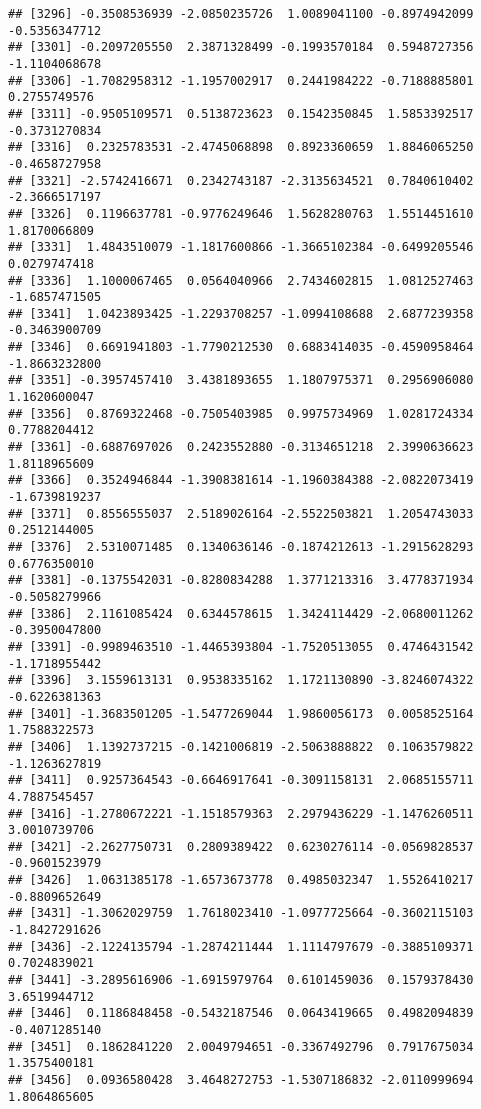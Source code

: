 \documentclass[
]{article}
\begin{document}
\begin{verbatim}
## [3296] -0.3508536939 -2.0850235726  1.0089041100 -0.8974942099 -0.5356347712
## [3301] -0.2097205550  2.3871328499 -0.1993570184  0.5948727356 -1.1104068678
## [3306] -1.7082958312 -1.1957002917  0.2441984222 -0.7188885801  0.2755749576
## [3311] -0.9505109571  0.5138723623  0.1542350845  1.5853392517 -0.3731270834
## [3316]  0.2325783531 -2.4745068898  0.8923360659  1.8846065250 -0.4658727958
## [3321] -2.5742416671  0.2342743187 -2.3135634521  0.7840610402 -2.3666517197
## [3326]  0.1196637781 -0.9776249646  1.5628280763  1.5514451610  1.8170066809
## [3331]  1.4843510079 -1.1817600866 -1.3665102384 -0.6499205546  0.0279747418
## [3336]  1.1000067465  0.0564040966  2.7434602815  1.0812527463 -1.6857471505
## [3341]  1.0423893425 -1.2293708257 -1.0994108688  2.6877239358 -0.3463900709
## [3346]  0.6691941803 -1.7790212530  0.6883414035 -0.4590958464 -1.8663232800
## [3351] -0.3957457410  3.4381893655  1.1807975371  0.2956906080  1.1620600047
## [3356]  0.8769322468 -0.7505403985  0.9975734969  1.0281724334  0.7788204412
## [3361] -0.6887697026  0.2423552880 -0.3134651218  2.3990636623  1.8118965609
## [3366]  0.3524946844 -1.3908381614 -1.1960384388 -2.0822073419 -1.6739819237
## [3371]  0.8556555037  2.5189026164 -2.5522503821  1.2054743033  0.2512144005
## [3376]  2.5310071485  0.1340636146 -0.1874212613 -1.2915628293  0.6776350010
## [3381] -0.1375542031 -0.8280834288  1.3771213316  3.4778371934 -0.5058279966
## [3386]  2.1161085424  0.6344578615  1.3424114429 -2.0680011262 -0.3950047800
## [3391] -0.9989463510 -1.4465393804 -1.7520513055  0.4746431542 -1.1718955442
## [3396]  3.1559613131  0.9538335162  1.1721130890 -3.8246074322 -0.6226381363
## [3401] -1.3683501205 -1.5477269044  1.9860056173  0.0058525164  1.7588322573
## [3406]  1.1392737215 -0.1421006819 -2.5063888822  0.1063579822 -1.1263627819
## [3411]  0.9257364543 -0.6646917641 -0.3091158131  2.0685155711  4.7887545457
## [3416] -1.2780672221 -1.1518579363  2.2979436229 -1.1476260511  3.0010739706
## [3421] -2.2627750731  0.2809389422  0.6230276114 -0.0569828537 -0.9601523979
## [3426]  1.0631385178 -1.6573673778  0.4985032347  1.5526410217 -0.8809652649
## [3431] -1.3062029759  1.7618023410 -1.0977725664 -0.3602115103 -1.8427291626
## [3436] -2.1224135794 -1.2874211444  1.1114797679 -0.3885109371  0.7024839021
## [3441] -3.2895616906 -1.6915979764  0.6101459036  0.1579378430  3.6519944712
## [3446]  0.1186848458 -0.5432187546  0.0643419665  0.4982094839 -0.4071285140
## [3451]  0.1862841220  2.0049794651 -0.3367492796  0.7917675034  1.3575400181
## [3456]  0.0936580428  3.4648272753 -1.5307186832 -2.0110999694  1.8064865605

\end{verbatim}
\end{document}
